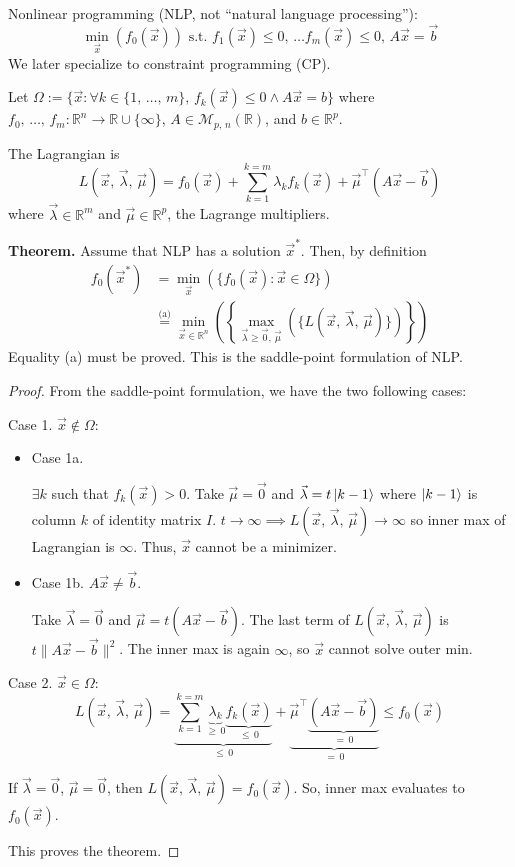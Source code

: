 \documentclass{article}
\newcommand{\R}{\mathbb{R}}             %
\newcommand{\M}{\mathcal{M}}            %
\newcommand{\x}{\vec{x}}                %
\newcommand{\rl}[1]{\left(#1\right)}
\begin{document}
Nonlinear programming (NLP, not ``natural language processing''):
\[
    \min_{\x}\rl{f_0(\x)} \text{ s.t. } f_1(\x) \leq 0,\, \ldots f_m(\x) \leq 0,\, A\x = \vec{b}
\]
We later specialize to constraint programming (CP).

Let $\Omega := \{\x : \forall k \in \{1,\, \ldots,\, m\},\, f_k(\x) \leq 0 \wedge A\x = b\}$ where $f_0,\, \ldots,\, f_m \colon \R^n \to \R \cup \{\infty\}$, $A \in \M_{p,\, n}(\R)$, and $b \in \R^p$.

The Lagrangian is
\[
    L\rl{\x,\, \vec{\lambda},\, \vec{\mu}} = f_0(\x) + \sum_{k = 1}^{k = m}\lambda_k f_k(\x) + \vec{\mu}^\top(A\x - \vec{b})
\]
where $\vec{\lambda} \in \R^m$ and $\vec{\mu} \in \R^p$, the Lagrange multipliers.

\textbf{Theorem.} Assume that NLP has a solution $\x^*$. Then, by definition
\begin{align*}
    f_0(\x^*) &= \min_{\x}\rl{\{f_0(\x) : \x \in \Omega\}} \\
    &\overset{\text{(a)}}{=} \min_{\x \in \R^n}\rl{\left\{\max_{\vec{\lambda} \geq \vec{0},\, \vec{\mu}}\rl{\{L\rl{\x,\, \vec{\lambda},\, \vec{\mu}}\}}\right\}}
\end{align*}
Equality (a) must be proved. This is the saddle-point formulation of NLP.

\begin{proof}
    From the saddle-point formulation, we have the two following cases:

    Case 1. $\x \notin \Omega$:
    \begin{itemize}
        \item Case 1a.

        $\exists k$ such that $f_k(\x) > 0$. Take $\vec{\mu} = \vec{0}$ and $\vec{\lambda} = t\ket{k - 1}$ where $\ket{k - 1}$ is column $k$ of identity matrix $I$. $t \to \infty \implies L\rl{\x,\, \vec{\lambda},\, \vec{\mu}} \to \infty$ so inner max of Lagrangian is $\infty$. Thus, $\x$ cannot be a minimizer.

        \item Case 1b. $A\x \neq \vec{b}$.

        Take $\vec{\lambda} = \vec{0}$ and $\vec{\mu} = t(A\x - \vec{b})$. The last term of $L\rl{\x,\, \vec{\lambda},\, \vec{\mu}}$ is $t\|A\x - \vec{b}\|^2$. The inner max is again $\infty$, so $\x$ cannot solve outer min.
    \end{itemize}

    Case 2. $\x \in \Omega$:
    \[
        L\rl{\x,\, \vec{\lambda},\, \vec{\mu}} = \underbrace{\sum_{k = 1}^{k = m} \underbrace{\lambda_k}_{\geq\, 0} \underbrace{f_k(\x)}_{\leq\, 0}}_{\leq\, 0} + \underbrace{\vec{\mu}^\top\underbrace{(A\x - \vec{b})}_{=\, 0}}_{=\, 0} \leq f_0(\x)
    \]

    If $\vec{\lambda} = \vec{0}$, $\vec{\mu} = \vec{0}$, then $L\rl{\x,\, \vec{\lambda},\, \vec{\mu}} = f_0(\x)$. So, inner max evaluates to $f_0(\x)$.

    This proves the theorem.
\end{proof}
\end{document}

